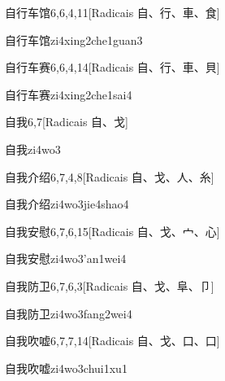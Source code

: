 \begin{entry}{自行车馆}{6,6,4,11}[Radicais ⾃、⾏、⾞、⾷]
  \begin{phonetics}{自行车馆}{zi4xing2che1guan3}
  \end{phonetics}
\end{entry}

\begin{entry}{自行车赛}{6,6,4,14}[Radicais ⾃、⾏、⾞、⾙]
  \begin{phonetics}{自行车赛}{zi4xing2che1sai4}
  \end{phonetics}
\end{entry}

\begin{entry}{自我}{6,7}[Radicais ⾃、⼽]
  \begin{phonetics}{自我}{zi4wo3}
  \end{phonetics}
\end{entry}

\begin{entry}{自我介绍}{6,7,4,8}[Radicais ⾃、⼽、⼈、⽷]
  \begin{phonetics}{自我介绍}{zi4wo3jie4shao4}
  \end{phonetics}
\end{entry}

\begin{entry}{自我安慰}{6,7,6,15}[Radicais ⾃、⼽、⼧、⼼]
  \begin{phonetics}{自我安慰}{zi4wo3'an1wei4}
  \end{phonetics}
\end{entry}

\begin{entry}{自我防卫}{6,7,6,3}[Radicais ⾃、⼽、⾩、⼙]
  \begin{phonetics}{自我防卫}{zi4wo3fang2wei4}
  \end{phonetics}
\end{entry}

\begin{entry}{自我吹嘘}{6,7,7,14}[Radicais ⾃、⼽、⼝、⼝]
  \begin{phonetics}{自我吹嘘}{zi4wo3chui1xu1}
  \end{phonetics}
\end{entry}


